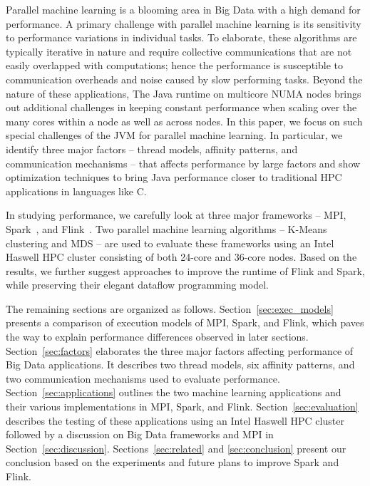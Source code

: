 \documentclass[10pt, conference, compsocconf]{IEEEtran}
\begin{document}
Parallel machine learning is a blooming area in Big Data with a high demand for performance. A primary challenge with parallel machine learning is its sensitivity to performance variations in individual tasks. To elaborate, these algorithms are typically iterative in nature and require collective communications that are not easily overlapped with computations; hence the performance is susceptible to communication overheads and noise caused by slow performing tasks. Beyond the nature of these applications, The Java runtime on multicore \ac{NUMA} nodes brings out additional challenges in keeping constant performance when scaling over the many cores within a node as well as across nodes. In this paper, we focus on such special challenges of the \ac{JVM} for parallel machine learning. In particular, we identify three major factors -- thread models, affinity patterns, and communication mechanisms -- that affects performance by large factors and show optimization techniques to bring Java performance closer to traditional \ac{HPC} applications in languages like C.

In studying performance, we carefully look at three major frameworks -- \ac{MPI}, Spark~\cite{Zaharia:2010:SCC:1863103.1863113}, and Flink~\cite{apache_flink, carbone2015lightweight}. Two parallel machine learning algorithms -- K-Means clustering and \ac{MDS} -- are used to evaluate these frameworks using an Intel Haswell \ac{HPC} cluster consisting of both 24-core and 36-core nodes. Based on the results, we further suggest approaches to improve the runtime of Flink and Spark, while preserving their elegant dataflow programming model.

The remaining sections are organized as follows. Section~\ref{sec:exec_models} presents a comparison of execution models of \ac{MPI}, Spark, and Flink, which paves the way to explain performance differences observed in later sections. Section~\ref{sec:factors} elaborates the three major factors affecting performance of Big Data applications. It describes two thread models, six affinity patterns, and two communication mechanisms used to evaluate performance. Section~\ref{sec:applications} outlines the two machine learning applications and their various implementations in \ac{MPI}, Spark, and Flink. Section~\ref{sec:evaluation} describes the testing of these applications using an Intel Haswell \ac{HPC} cluster followed by a discussion on Big Data frameworks and \ac{MPI} in Section~\ref{sec:discussion}. Sections~\ref{sec:related} and \ref{sec:conclusion} present our conclusion based on the experiments and future plans to improve Spark and Flink.
\end{document}
